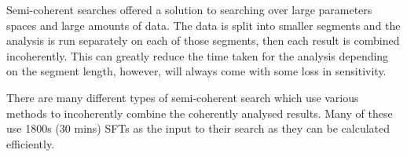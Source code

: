 Semi-coherent searches offered a solution to searching over large parameters spaces and large amounts of data. 
The data is split into smaller segments and the analysis is run separately on each of those segments, then each result is combined incoherently. 
This can greatly reduce the time taken for the analysis depending on the segment length, however, will always come with some loss in sensitivity. 

There are many different types of semi-coherent search which use various methods to incoherently combine the coherently analysed results. Many of these use 1800s (30 mins) \acp{SFT} as the input to their search as they can be calculated efficiently. 


